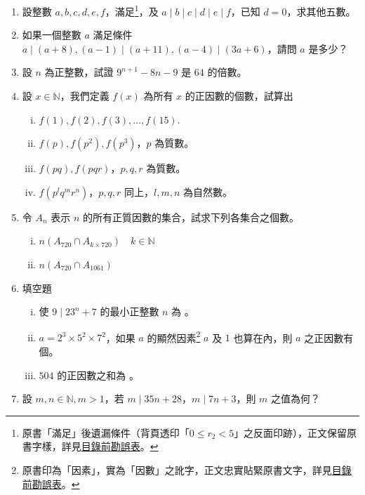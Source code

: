 \begin{enumerate}[1.]
  \item \label{item:ex6-1-8} 設整數 $a, b, c, d, e, f$，滿足\footnote{原書「滿足」後遺漏條件（背頁透印「$0 \le r_2 < 5$」之反面印跡），正文保留原書字樣，詳見\hyperref[sec:master_errata_notes]{目錄前勘誤表}。}，及 $a \mid b \mid c \mid d \mid e \mid f$，已知 $d=0$，求其他五數。

  \item 如果一個整數 $a$ 滿足條件 $a \mid (a+8), (a-1) \mid (a+11), (a-4) \mid (3a+6)$，請問 $a$ 是多少？

  \item 設 $n$ 為正整數，試證 $9^{n+1}-8n-9$ 是 $64$ 的倍數。

  \item 設 $x \in \mathbb{N}$，我們定義 $f(x)$ 為所有 $x$ 的正因數的個數，試算出
  \begin{enumerate}[(i)]
    \item $f(1), f(2), f(3), \dots, f(15)$.
    \item $f(p), f(p^2), f(p^3)$，$p$ 為質數。
    \item $f(pq), f(pqr)$，$p, q, r$ 為質數。
    \item $f(p^l q^m r^n)$，$p, q, r$ 同上，$l, m, n$ 為自然數。
  \end{enumerate}

  \item 令 $A_n$ 表示 $n$ 的所有正質因數的集合，試求下列各集合之個數。
  \begin{enumerate}[(i)]
    \item $n(A_{720} \cap A_{k \times 720}) \quad k \in \mathbb{N}$
    \item $n(A_{720} \cap A_{1061})$
  \end{enumerate}

  \item 填空題
  \begin{enumerate}[(i)]
    \item 使 $9 \mid 23^n+7$ 的最小正整數 $n$ 為 \blank。
    \item \label{item:ex6-1-13-2} $a=2^3 \times 5^2 \times 7^2$，如果 $a$ 的顯然因素\footnote{原書印為「因素」，實為「因數」之訛字，正文忠實貼緊原書文字，詳見\hyperref[sec:master_errata_notes]{目錄前勘誤表}。} $a$ 及 $1$ 也算在內，則 $a$ 之正因數有 \blank 個。
    \item $504$ 的正因數之和為 \blank。
  \end{enumerate}

  \item 設 $m, n \in \mathbb{N}, m > 1$，若 $m \mid 35n+28$，$m \mid 7n+3$，則 $m$ 之值為何？


\end{enumerate}
